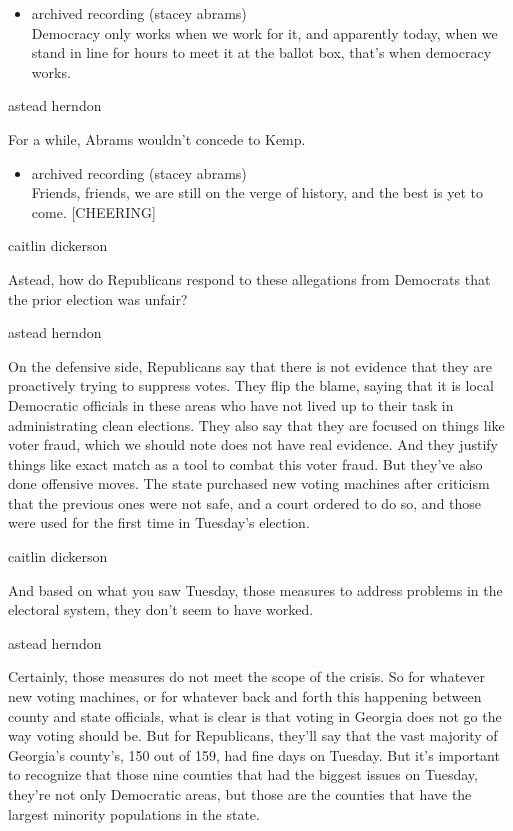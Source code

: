 \begin{itemize}
\tightlist
\item
  archived recording (stacey abrams)\\
  Democracy only works when we work for it, and apparently today, when
  we stand in line for hours to meet it at the ballot box, that's when
  democracy works.
\end{itemize}

astead herndon

For a while, Abrams wouldn't concede to Kemp.

\begin{itemize}
\tightlist
\item
  archived recording (stacey abrams)\\
  Friends, friends, we are still on the verge of history, and the best
  is yet to come. {[}CHEERING{]}
\end{itemize}

caitlin dickerson

Astead, how do Republicans respond to these allegations from Democrats
that the prior election was unfair?

astead herndon

On the defensive side, Republicans say that there is not evidence that
they are proactively trying to suppress votes. They flip the blame,
saying that it is local Democratic officials in these areas who have not
lived up to their task in administrating clean elections. They also say
that they are focused on things like voter fraud, which we should note
does not have real evidence. And they justify things like exact match as
a tool to combat this voter fraud. But they've also done offensive
moves. The state purchased new voting machines after criticism that the
previous ones were not safe, and a court ordered to do so, and those
were used for the first time in Tuesday's election.

caitlin dickerson

And based on what you saw Tuesday, those measures to address problems in
the electoral system, they don't seem to have worked.

astead herndon

Certainly, those measures do not meet the scope of the crisis. So for
whatever new voting machines, or for whatever back and forth this
happening between county and state officials, what is clear is that
voting in Georgia does not go the way voting should be. But for
Republicans, they'll say that the vast majority of Georgia's county's,
150 out of 159, had fine days on Tuesday. But it's important to
recognize that those nine counties that had the biggest issues on
Tuesday, they're not only Democratic areas, but those are the counties
that have the largest minority populations in the state.

